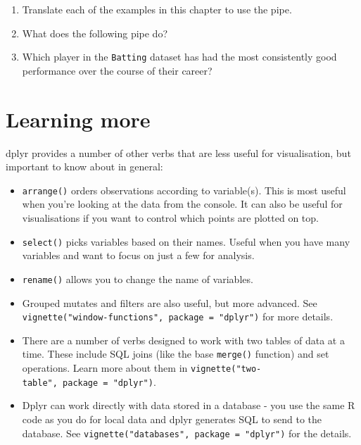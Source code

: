\begin{enumerate}
\def\labelenumi{\arabic{enumi}.}
\item
  Translate each of the examples in this chapter to use the pipe.
\item
  What does the following pipe do?

\begin{Shaded}
\end{Shaded}
\item
  Which player in the \texttt{Batting} dataset has had the most
  consistently good performance over the course of their career?
\end{enumerate}

\section{Learning more}

dplyr provides a number of other verbs that are less useful for
visualisation, but important to know about in general:

\begin{itemize}
\item
  \texttt{arrange()} orders observations according to variable(s). This
  is most useful when you're looking at the data from the console. It
  can also be useful for visualisations if you want to control which
  points are plotted on top.
\item
  \texttt{select()} picks variables based on their names. Useful when
  you have many variables and want to focus on just a few for analysis.
\item
  \texttt{rename()} allows you to change the name of variables.
\item
  Grouped mutates and filters are also useful, but more advanced. See
  \texttt{vignette("window-functions",\ package\ =\ "dplyr")} for more
  details.
\item
  There are a number of verbs designed to work with two tables of data
  at a time. These include SQL joins (like the base \texttt{merge()}
  function) and set operations. Learn more about them in
  \texttt{vignette("two-table",\ package\ =\ "dplyr")}.
\item
  Dplyr can work directly with data stored in a database - you use the
  same R code as you do for local data and dplyr generates SQL to send
  to the database. See
  \texttt{vignette("databases",\ package\ =\ "dplyr")} for the details.
\end{itemize}

